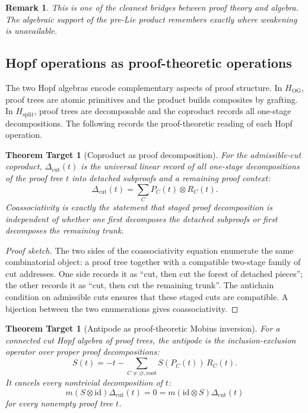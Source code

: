 \documentclass[11pt]{article}
\newtheorem{remark}[theorem]{Remark}
\newtheorem{target}[theorem]{Theorem Target}
\begin{document}
\begin{remark}
This is one of the cleanest bridges between proof theory and algebra.  The
algebraic support of the pre-Lie product remembers exactly where weakening is
unavailable.
\end{remark}

\subsection{Hopf operations as proof-theoretic operations}

The two Hopf algebras encode complementary aspects of proof structure.  In $H_{\mathrm{OG}}$, proof trees are atomic primitives and the product builds composites by grafting.  In $H_{\mathrm{split}}$, proof trees are decomposable and the coproduct records all one-stage decompositions.  The following records the proof-theoretic reading of each Hopf operation.

\begin{target}[Coproduct as proof decomposition]
For the admissible-cut coproduct, \(\Delta_{\mathrm{cut}}(t)\) is the universal
linear record of all one-stage decompositions of the proof tree \(t\) into
detached subproofs and a remaining proof context:
\[
\Delta_{\mathrm{cut}}(t)
=
\sum_C P_C(t)\otimes R_C(t).
\]
Coassociativity is exactly the statement that staged proof decomposition is
independent of whether one first decomposes the detached subproofs or first
decomposes the remaining trunk.
\end{target}

\begin{proof}[Proof sketch]
The two sides of the coassociativity equation enumerate the same combinatorial
object: a proof tree together with a compatible two-stage family of cut
addresses.  One side records it as ``cut, then cut the forest of detached
pieces''; the other records it as ``cut, then cut the remaining trunk''.  The
antichain condition on admissible cuts ensures that these staged cuts are
compatible.  A bijection between the two enumerations gives coassociativity.
\end{proof}

\begin{target}[Antipode as proof-theoretic Mobius inversion]
For a connected cut Hopf algebra of proof trees, the antipode is the
inclusion-exclusion operator over proper proof decompositions:
\[
S(t)=-t-\sum_{C\neq\varnothing,\mathrm{root}} S(P_C(t))\,R_C(t).
\]
It cancels every nontrivial decomposition of \(t\):
\[
m(S\otimes \mathrm{id})\Delta_{\mathrm{cut}}(t)=0
=m(\mathrm{id}\otimes S)\Delta_{\mathrm{cut}}(t)
\]
for every nonempty proof tree \(t\).
\end{target}
\end{document}
